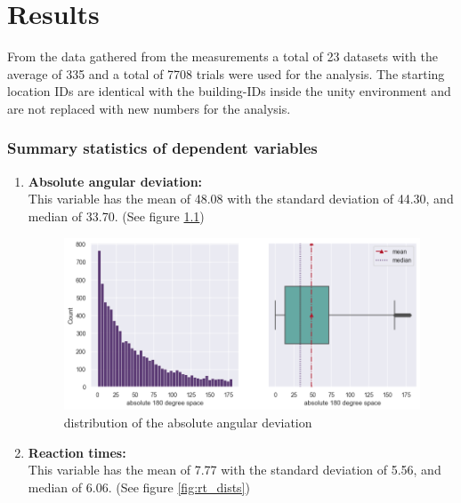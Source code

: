 \chapter{Results}

From the data gathered from the measurements a total of 23 datasets with the average of 335 and a total of 7708 trials were used for the analysis. The starting location IDs are identical with the building-IDs inside the unity environment and are not replaced with new numbers for the analysis.

\subsection{Summary statistics of dependent variables}

\begin{enumerate}
	\item \textbf{Absolute angular deviation:} \\
	This variable has the mean of 48.08 with the standard deviation of 44.30, and median of 33.70. (See figure \ref{fig:angular_dev_dists})
	
	\begin{figure}[h]
		\centering
		\includegraphics[width=150mm]{figures/angular_deviation_hist_box_23.png}
		\caption[Distribution of the absolute angular deviation]{distribution of the absolute angular deviation}
		\label{fig:angular_dev_dists}
	\end{figure}

	\item \textbf{Reaction times:} \\
	This variable has the mean of 7.77 with the standard deviation of 5.56, and median of 6.06. (See figure \ref{fig:rt_dists})
	

\end{enumerate}
